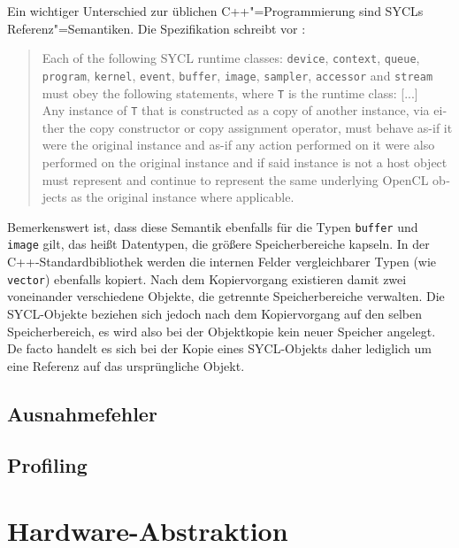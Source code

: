 Ein wichtiger Unterschied zur üblichen C++"=Programmierung sind SYCLs
Referenz"=Semantiken. Die Spezifikation schreibt vor
\cite[siehe][Abschnitt 4.3.2]{sycl2019}:
\begin{otherlanguage}{english}
    \begin{quote}
        Each of the following SYCL runtime classes: \texttt{device},
        \texttt{context}, \texttt{queue}, \texttt{program}, \texttt{kernel},
        \texttt{event}, \texttt{buffer}, \texttt{image}, \texttt{sampler},
        \texttt{accessor} and \texttt{stream} must obey the following
        statements, where \texttt{T} is the runtime class: [...]
        \\
        Any instance of \texttt{T} that is constructed as a copy of another
        instance, via either the copy constructor or copy assignment operator,
        must behave as-if it were the original instance and as-if any action
        performed on it were also performed on the original instance and if said
        instance is not a host object must represent and continue to represent
        the same underlying OpenCL objects as the original instance where
        applicable.
    \end{quote}
\end{otherlanguage}
Bemerkenswert ist, dass diese Semantik ebenfalls für die Typen \texttt{buffer}
und \texttt{image} gilt, das heißt Datentypen, die größere Speicherbereiche
kapseln. In der C++-Standardbibliothek werden die internen Felder vergleichbarer
Typen (wie \texttt{vector}) ebenfalls kopiert. Nach dem Kopiervorgang existieren
damit zwei voneinander verschiedene Objekte, die getrennte Speicherbereiche
verwalten. Die SYCL-Objekte beziehen sich jedoch nach dem Kopiervorgang auf den
selben Speicherbereich, es wird also bei der Objektkopie kein neuer Speicher
angelegt. De facto handelt es sich bei der Kopie eines SYCL-Objekts daher
lediglich um eine Referenz auf das ursprüngliche Objekt.

\subsection{Ausnahmefehler}\label{sycl:api:exceptions}

\subsection{Profiling}\label{sycl:api:profiling}

\section{Hardware-Abstraktion}\label{sycl:api:abstraktion}

